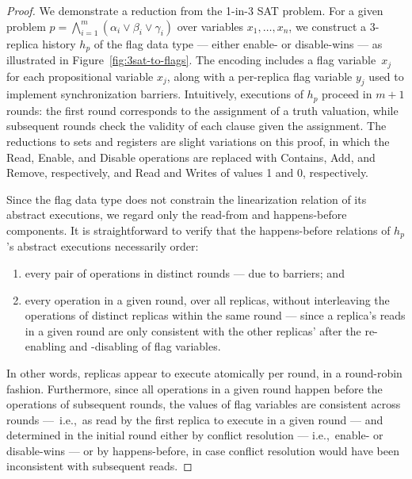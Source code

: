\begin{proof}

  We demonstrate a reduction from the 1-in-3 SAT problem. For a given problem $p = \bigwedge_{i=1}^{m} (\alpha_i \lor \beta_i \lor \gamma_i)$ over variables $x_1, \ldots, x_n$, we construct a 3-replica history $h_p$ of the flag data type — either enable- or disable-wins — as illustrated in Figure~\ref{fig:3sat-to-flags}. The encoding includes a flag variable~$x_j$ for each propositional variable $x_j$, along with a per-replica flag variable $y_j$ used to implement synchronization barriers. Intuitively, executions of $h_p$ proceed in $m+1$ rounds: the first round corresponds to the assignment of a truth valuation, while subsequent rounds check the validity of each clause given the assignment. The reductions to sets and registers are slight variations on this proof, in which the \textrm{Read}, \textrm{Enable}, and \textrm{Disable} operations are replaced with \textrm{Contains}, \textrm{Add}, and \textrm{Remove}, respectively, and \textrm{Read} and \textrm{Writes} of values 1 and 0, respectively.
  
  Since the flag data type does not constrain the linearization relation of its abstract executions, we regard only the read-from and happens-before components. It is straightforward to verify that the happens-before relations of $h_p$’s abstract executions necessarily order:
  \vspace{-1.5mm}
  \begin{enumerate}

    \item every pair of operations in distinct rounds — due to barriers; and

    \item every operation in a given round, over all replicas, without interleaving the operations of distinct replicas within the same round — since a replica’s reads in a given round are only consistent with the other replicas’ after the re-enabling and -disabling of flag variables.
\vspace{-1.5mm}
  \end{enumerate}

  In other words, replicas appear to execute atomically per round, in a round-robin fashion. Furthermore, since all operations in a given round happen before the operations of subsequent rounds, the values of flag variables are consistent across rounds — i.e.,~as read by the first replica to execute in a given round — and determined in the initial round either by conflict resolution — i.e.,~enable- or disable-wins — or by happens-before, in case conflict resolution would have been inconsistent with subsequent reads.


\end{proof}
